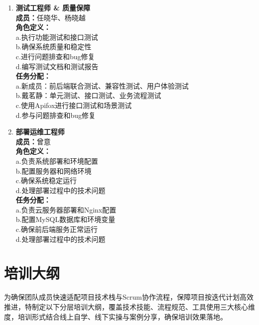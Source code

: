 \begin{enumerate}
    \item \textbf{测试工程师 & 质量保障} \\
          \textbf{成员：}任晓华、杨晓越 \\
          \textbf{角色定义：}  \\
          a.执行功能测试和接口测试  \\
          b.确保系统质量和稳定性  \\
          c.进行问题排查和bug修复  \\
          d.编写测试文档和测试报告  \\
          \textbf{任务分配：}  \\
          a.新成员：前后端联合测试、兼容性测试、用户体验测试  \\
          b.戴茗静：单元测试、接口测试、业务流程测试  \\
          c.使用Apifox进行接口测试和场景测试  \\
          d.参与问题排查和bug修复  \\

    \item \textbf{部署运维工程师} \\
          \textbf{成员：}曾意 \\
          \textbf{角色定义：}  \\
          a.负责系统部署和环境配置  \\
          b.配置服务器和网络环境  \\
          c.确保系统稳定运行  \\
          d.处理部署过程中的技术问题  \\
          \textbf{任务分配：}  \\
          a.负责云服务器部署和Nginx配置  \\
          b.配置MySQL数据库和环境变量  \\
          c.确保前后端服务正常运行  \\
          d.处理部署过程中的技术问题  \\


\end{enumerate}


\section{培训大纲}
为确保团队成员快速适配项目技术栈与Scrum协作流程，保障项目按迭代计划高效推进，特制定以下分层培训大纲，覆盖技术技能、流程规范、工具使用三大核心维度，培训形式结合线上自学、线下实操与案例分享，确保培训效果落地。

